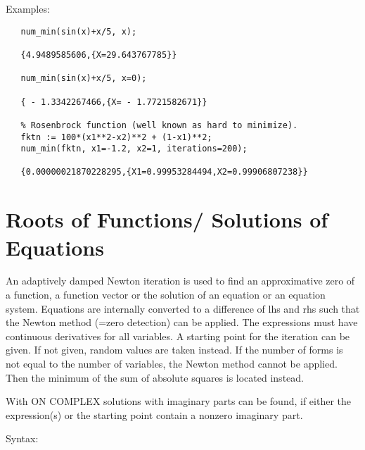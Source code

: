Examples:

\begin{verbatim}
   num_min(sin(x)+x/5, x);

   {4.9489585606,{X=29.643767785}}

   num_min(sin(x)+x/5, x=0);

   { - 1.3342267466,{X= - 1.7721582671}}

   % Rosenbrock function (well known as hard to minimize).
   fktn := 100*(x1**2-x2)**2 + (1-x1)**2;
   num_min(fktn, x1=-1.2, x2=1, iterations=200);

   {0.00000021870228295,{X1=0.99953284494,X2=0.99906807238}}

\end{verbatim}

\section{Roots of Functions/ Solutions of Equations}

An adaptively damped Newton iteration is used to find
an approximative zero of a function, a function vector or the solution
of an equation or an equation system. Equations are
internally converted to a difference of lhs and rhs such
that the Newton method (=zero detection) can be applied. The expressions
must have continuous derivatives for all variables.
A starting point for the iteration can be given. If not given,
random values are taken instead. If the number of
forms is not equal to the number of variables, the
Newton method cannot be applied. Then the minimum
of the sum of absolute squares is located instead.

With ON COMPLEX solutions with imaginary parts can be
found, if either the expression(s) or the starting point
contain a nonzero imaginary part.

Syntax:

